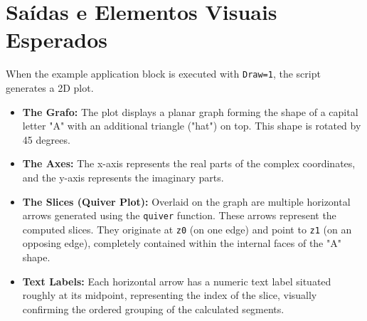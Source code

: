 \section{Saídas e Elementos Visuais Esperados}
When the example application block is executed with \texttt{Draw=1}, the script generates a 2D plot.
\begin{itemize}
\item \textbf{The Grafo:} The plot displays a planar graph forming the shape of a capital letter "A" with an additional triangle ("hat") on top. This shape is rotated by 45 degrees.
\item \textbf{The Axes:} The x-axis represents the real parts of the complex coordinates, and the y-axis represents the imaginary parts.
\item \textbf{The Slices (Quiver Plot):} Overlaid on the graph are multiple horizontal arrows generated using the \texttt{quiver} function. These arrows represent the computed slices. They originate at \texttt{z0} (on one edge) and point to \texttt{z1} (on an opposing edge), completely contained within the internal faces of the "A" shape.
\item \textbf{Text Labels:} Each horizontal arrow has a numeric text label situated roughly at its midpoint, representing the index of the slice, visually confirming the ordered grouping of the calculated segments.
\end{itemize}
